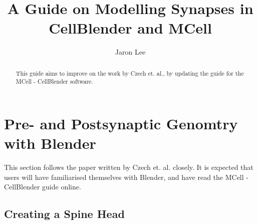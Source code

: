 \documentclass[twoside,a4paper]{refart}
\title{A Guide on Modelling Synapses in CellBlender and MCell}
\author{Jaron Lee}
\date{}
\begin{document}
\maketitle

\begin{abstract}
    This guide aims to improve on the work by Czech et. al., by updating the guide for the MCell - CellBlender software.
\end{abstract}

\newpage



\section{Pre- and Postsynaptic Genomtry with Blender}
This section follows the paper written by Czech et. al. closely. It is expected that users will have familiarised themselves with Blender, and have read the MCell - CellBlender guide online.

\subsection{Creating a Spine Head}
\end{document}
